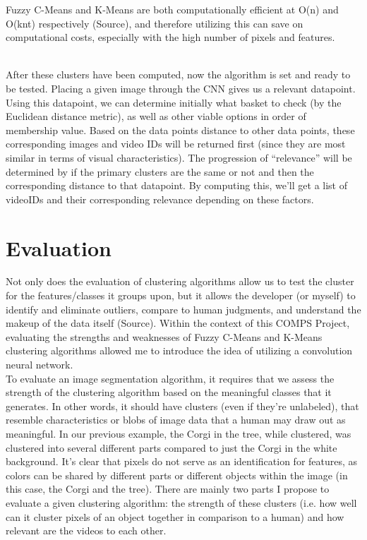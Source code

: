 \documentclass[10pt,twocolumn]{article}
\begin{document}
Fuzzy C-Means and K-Means are both computationally efficient at O(n) and O(knt) respectively (Source), and therefore utilizing this can save on computational costs, especially with the high number of pixels and features. 

\\ \indent After these clusters have been computed, now the algorithm is set and ready to be tested. Placing a given image through the CNN gives us a relevant datapoint. Using this datapoint, we can determine initially what basket to check (by the Euclidean distance metric), as well as other viable options in order of membership value. Based on the data points distance to other data points, these corresponding images and video IDs will be returned first (since they are most similar in terms of visual characteristics). The progression of “relevance” will be determined by if the primary clusters are the same or not and then the corresponding distance to that datapoint. By computing this, we’ll get a list of videoIDs and their corresponding relevance depending on these factors. 

\section{Evaluation}

\indent Not only does the evaluation of clustering algorithms allow us to test the cluster for the features/classes it groups upon, but it allows the developer (or myself) to identify and eliminate outliers, compare to human judgments, and understand the makeup of the data itself (Source). Within the context of this COMPS Project, evaluating the strengths and weaknesses of Fuzzy C-Means and K-Means clustering algorithms allowed me to introduce the idea of utilizing a convolution neural network.
\\
\indent To evaluate an image segmentation algorithm, it requires that we assess the strength of the clustering algorithm based on the meaningful classes that it generates. In other words, it should have clusters (even if they’re unlabeled), that resemble characteristics or blobs of image data that a human may draw out as meaningful. In our previous example, the Corgi in the tree, while clustered, was clustered into several different parts compared to just the Corgi in the white background. It’s clear that pixels do not serve as an identification for features, as colors can be shared by different parts or different objects within the image (in this case, the Corgi and the tree). There are mainly two parts I propose to evaluate a given clustering algorithm: the strength of these clusters (i.e. how well can it cluster pixels of an object together in comparison to a human) and how relevant are the videos to each other.
\end{document}
